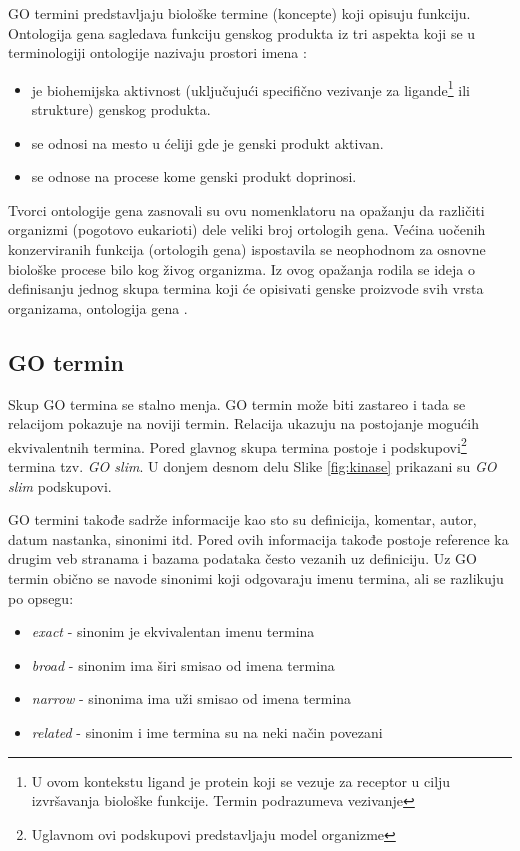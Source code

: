 GO termini predstavljaju biološke
termine (koncepte) koji opisuju funkciju. Ontologija gena sagledava funkciju
genskog produkta iz tri aspekta koji se u terminologiji ontologije nazivaju
prostori imena :
\begin{itemize}
  \item {} je biohemijska aktivnost (uključujući
    specifično vezivanje za ligande\footnote{
      U ovom kontekstu ligand je protein koji se vezuje za receptor u cilju
      izvršavanja biološke funkcije. Termin podrazumeva vezivanje 
    } ili strukture) genskog produkta.
  \item {} se odnosi na mesto u ćeliji gde je
    genski produkt aktivan.
  \item {} se odnose na procese kome genski produkt
    doprinosi.
\end{itemize}

Tvorci ontologije gena zasnovali su ovu nomenklatoru na opažanju da različiti
organizmi (pogotovo eukarioti) dele veliki broj ortologih gena. Većina uočenih
konzerviranih funkcija (ortologih gena) ispostavila se neophodnom za osnovne
biološke procese bilo kog živog organizma.  Iz ovog opažanja rodila se ideja o
definisanju jednog skupa termina koji će opisivati genske proizvode svih vrsta
organizama, ontologija gena \parencite{GO2000}.


\subsection{GO termin}

Skup GO termina se stalno menja. GO termin može biti zastareo i tada se
relacijom  pokazuje na noviji termin. Relacija
 ukazuju na postojanje mogućih ekvivalentnih termina. Pored
glavnog skupa termina postoje i podskupovi\footnote{Uglavnom ovi podskupovi
predstavljaju model organizme} termina tzv. \textit{GO slim}. U donjem desnom
delu Slike \ref{fig:kinase} prikazani su \textit{GO slim} podskupovi.

GO termini takođe sadrže informacije kao sto su definicija, komentar, autor, datum
nastanka, sinonimi itd. Pored ovih informacija takođe postoje reference ka
drugim veb stranama i bazama podataka često vezanih uz definiciju.  Uz GO termin
obično se navode sinonimi koji odgovaraju imenu termina, ali se razlikuju po
opsegu:
\begin{itemize}
  \item \textit{exact} - sinonim je ekvivalentan imenu termina
  \item \textit{broad} - sinonim ima širi smisao od imena termina
  \item \textit{narrow} - sinonima ima uži smisao od imena termina
  \item \textit{related} - sinonim i ime termina su na neki način povezani
\end{itemize}


